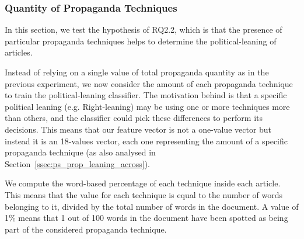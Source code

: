 



\subsubsection{Quantity of Propaganda Techniques}

In this section, we test the hypothesis of RQ2.2, which is that the presence of particular propaganda techniques helps to determine the political-leaning of articles. 

Instead of relying on a single value of total propaganda quantity as in the previous experiment, we now consider the amount of each propaganda technique to train the political-leaning classifier.
The motivation behind is that a specific political leaning (e.g. Right-leaning) may be using one or more techniques more than others, and the classifier could pick these differences to perform its decisions.
This means that our feature vector is not a one-value vector but instead it is an 18-values vector, each one representing the amount of a specific propaganda technique (as also analysed in Section~\ref{ssec:ps_prop_leaning_across}).


We compute the word-based percentage of each technique inside each article. This means that the value for each technique is equal to the number of words belonging to it, divided by the total number of words in the document. A value of 1\% means that 1 out of 100 words in the document have been spotted as being part of the considered propaganda technique.


